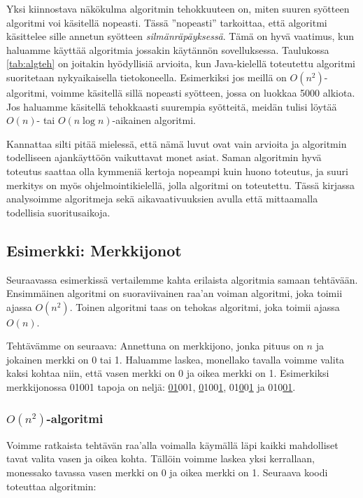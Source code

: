 Yksi kiinnostava näkökulma algoritmin tehokkuuteen on,
miten suuren syötteen algoritmi voi käsitellä nopeasti.
Tässä ''nopeasti'' tarkoittaa, että algoritmi käsittelee
sille annetun syötteen \emph{silmänräpäyksessä}.
Tämä on hyvä vaatimus, kun haluamme käyttää algoritmia
jossakin käytännön sovelluksessa.
Taulukossa \ref{tab:algteh} on joitakin hyödyllisiä arvioita,
kun Java-kielellä toteutettu
algoritmi suoritetaan nykyaikaisella tietokoneella.
Esimerkiksi jos meillä on $O(n^2)$-algoritmi, voimme käsitellä sillä
nopeasti syötteen, jossa on luokkaa 5000 alkiota.
Jos haluamme käsitellä tehokkaasti suurempia syötteitä,
meidän tulisi löytää $O(n)$- tai $O(n \log n)$-aikainen algoritmi.

Kannattaa silti pitää mielessä, että nämä luvut ovat vain arvioita ja algoritmin
todelliseen ajankäyttöön vaikuttavat monet asiat.
Saman algoritmin hyvä toteutus saattaa olla
kymmeniä kertoja nopeampi kuin huono toteutus,
ja suuri merkitys on myös ohjelmointikielellä,
jolla algoritmi on toteutettu.
Tässä kirjassa analysoimme algoritmeja sekä aikavaativuuksien
avulla että mittaamalla todellisia suoritusaikoja.

\subsection{Esimerkki: Merkkijonot}

Seuraavassa esimerkissä vertailemme kahta
erilaista algoritmia samaan tehtä\-vään.
Ensimmäinen algoritmi on suoraviivainen raa'an voiman
algoritmi, joka toimii ajassa $O(n^2)$.
Toinen algoritmi taas on tehokas algoritmi,
joka toimii ajassa $O(n)$.

Tehtävämme on seuraava: Annettuna on merkkijono,
jonka pituus on $n$ ja jokainen merkki on 0 tai 1.
Haluamme laskea, monellako tavalla voimme valita kaksi kohtaa
niin, että vasen merkki on 0 ja oikea merkki on 1.
Esimerkiksi merkkijonossa 01001 tapoja on neljä:
\underline{01}001, \underline{0}100\underline{1},
01\underline{0}0\underline{1} ja 010\underline{01}.

\subsubsection{$O(n^2)$-algoritmi}

Voimme ratkaista tehtävän raa'alla voimalla
käymällä läpi kaikki mahdolliset tavat valita vasen ja oikea kohta.
Tällöin voimme laskea yksi kerrallaan,
monessako tavassa vasen merkki on 0 ja oikea merkki on 1.
Seuraava koodi toteuttaa algoritmin:

